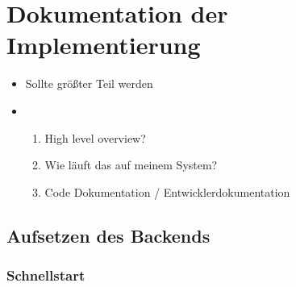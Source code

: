 \section{Dokumentation der Implementierung}
\begin{itemize}
	\item Sollte größter Teil werden
	\item \begin{enumerate}
		      \item High level overview?
		      \item Wie läuft das auf meinem System?
		      \item Code Dokumentation / Entwicklerdokumentation
	      \end{enumerate}
\end{itemize}





\subsection{Aufsetzen des Backends}

\subsubsection{Schnellstart}

